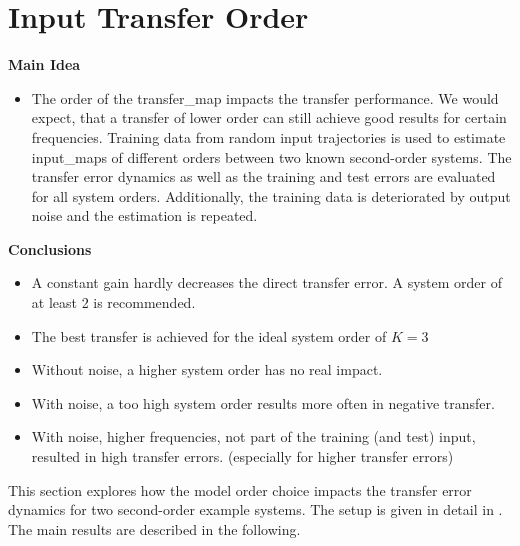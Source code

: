 \section{Input Transfer Order}\label{subsecapp:input_transfe_order}
\graphicspath{{./Bilder/appendix/tf_order}} 
\begin{commentnotes}
\textbf{Main Idea}
\vspace{-0.5em}
\begin{itemize}[noitemsep, topsep=0pt]
	\item The order of the \gls*{transfer_map} impacts the transfer performance. We would expect, that a transfer of lower order can still achieve good results for certain frequencies. Training data from random input trajectories is used to estimate \glspl*{input_map} of different orders between two known second-order systems. The transfer error dynamics as well as the training and test errors are evaluated for all system orders. Additionally, the training data is deteriorated by output noise and the estimation is repeated.
\end{itemize}

\textbf{Conclusions}
\vspace{-0.5em}
\begin{itemize}[noitemsep, topsep=0pt]
	\item A constant gain hardly decreases the direct transfer error. A system order of at least 2 is recommended.
	\item The best transfer is achieved for the ideal system order of $K=3$
	\item Without noise, a higher system order has no real impact.
	\item With noise, a too high system order results more often in negative transfer. 
	\item With noise, higher frequencies, not part of the training (and test) input, resulted in high transfer errors. (especially for higher transfer errors)
\end{itemize}
\end{commentnotes}


This section explores how the model order choice impacts the transfer error dynamics for two second-order example systems. The setup is given in detail in . The main results are described in the following. 


